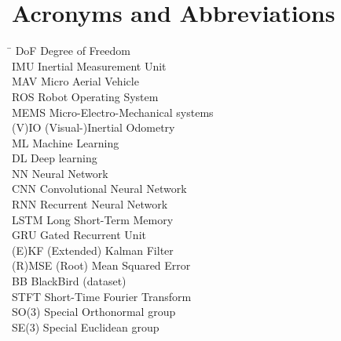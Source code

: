 \section*{Acronyms and Abbreviations}
  \begin{tabbing}
    \hspace*{1.8cm}  \= \kill
    DoF     \> Degree of Freedom \\[0.5ex]
    IMU     \> Inertial Measurement Unit \\[0.5ex]
    MAV     \> Micro Aerial Vehicle \\[0.5ex]
    ROS     \> Robot Operating System \\[0.5ex]
    MEMS    \> Micro-Electro-Mechanical systems \\[0.5ex]
    (V)IO   \> (Visual-)Inertial Odometry  \\[0.5ex]
    ML      \> Machine Learning  \\[0.5ex]
    DL      \> Deep learning  \\[0.5ex]
    NN      \> Neural Network  \\[0.5ex]
    CNN     \> Convolutional Neural Network  \\[0.5ex]
    RNN     \> Recurrent Neural Network  \\[0.5ex]
    LSTM    \> Long Short-Term Memory \\[0.5ex]
    GRU     \> Gated Recurrent Unit \\[0.5ex]
    (E)KF   \> (Extended) Kalman Filter \\[0.5ex]
    (R)MSE  \> (Root) Mean Squared Error  \\[0.5ex]
    BB      \> BlackBird (dataset)  \\[0.5ex]
    STFT    \> Short-Time Fourier Transform  \\[0.5ex]
    SO(3)   \> Special Orthonormal group \\[0.5ex]
    SE(3)   \> Special Euclidean group \\[0.5ex]
    
  \end{tabbing}

\clearpage

